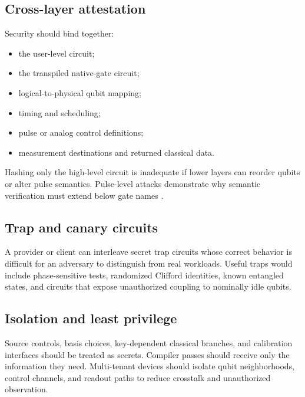 \subsection{Cross-layer attestation}

Security should bind together:

\begin{itemize}
  \item the user-level circuit;
  \item the transpiled native-gate circuit;
  \item logical-to-physical qubit mapping;
  \item timing and scheduling;
  \item pulse or analog control definitions;
  \item measurement destinations and returned classical data.
\end{itemize}

Hashing only the high-level circuit is inadequate if lower layers can reorder
qubits or alter pulse semantics. Pulse-level attacks demonstrate why semantic
verification must extend below gate names \cite{xu2024pulseattacks}.

\subsection{Trap and canary circuits}

A provider or client can interleave secret trap circuits whose correct behavior
is difficult for an adversary to distinguish from real workloads. Useful traps
would include phase-sensitive tests, randomized Clifford identities, known
entangled states, and circuits that expose unauthorized coupling to nominally
idle qubits.

\subsection{Isolation and least privilege}

Source controls, basis choices, key-dependent classical branches, and calibration
interfaces should be treated as secrets. Compiler passes should receive only the
information they need. Multi-tenant devices should isolate qubit neighborhoods,
control channels, and readout paths to reduce crosstalk and unauthorized
observation.

